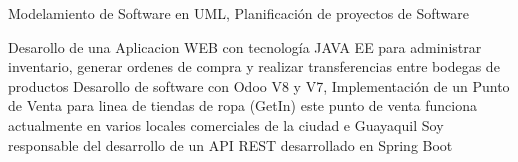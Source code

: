{Modelamiento de Software en UML, Planificación de proyectos de Software}

{Desarollo de una Aplicacion WEB con tecnología JAVA EE para administrar inventario, generar ordenes de compra y realizar transferencias entre bodegas de productos \newline
}
{Desarollo de software con Odoo V8 y V7, Implementación de un Punto de Venta para linea de tiendas de ropa (GetIn) este punto de venta funciona actualmente en varios locales comerciales de la ciudad e Guayaquil}
{Soy responsable del desarrollo de un API REST desarrollado en Spring Boot}

